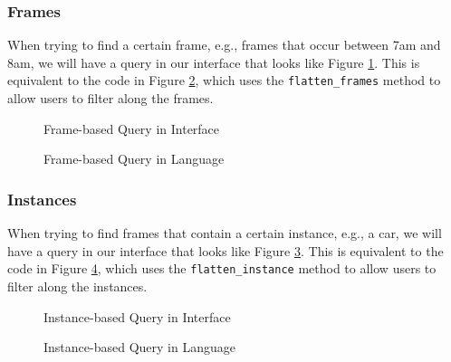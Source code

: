 \subsubsection{Frames}
When trying to find a certain frame, e.g., frames that occur between 7am and 8am, we will have a query in our interface that looks like Figure \ref{fig:Frame1}. This is equivalent to the code in Figure \ref{fig:Frame2}, which uses the \texttt{flatten\_frames} method to allow users to filter along the frames.

\begin{figure}[H]
    \caption{Frame-based Query in Interface}
    \label{fig:Frame1}
\end{figure}

\begin{figure}[H]
    \caption{Frame-based Query in Language}
    \label{fig:Frame2}
\end{figure}

\subsubsection{Instances}
When trying to find frames that contain a certain instance, e.g., a car, we will have a query in our interface that looks like Figure \ref{fig:Instance1}. This is equivalent to the code in Figure \ref{fig:Instance2}, which uses the \texttt{flatten\_instance} method to allow users to filter along the instances.

\begin{figure}[H]
    \caption{Instance-based Query in Interface}
    \label{fig:Instance1}
\end{figure}

\begin{figure}[H]
    \caption{Instance-based Query in Language}
    \label{fig:Instance2}
\end{figure}

